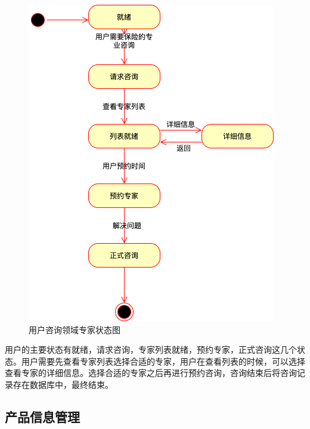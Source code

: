 \documentclass[a4paper]{ctexart}
\begin{document}
\begin{figure}[H]
\centering
\includegraphics[scale=0.5]{image/3_6状态图.png}
\caption{用户咨询领域专家状态图}
\label{fig:用户咨询领域专家状态图}
\end{figure}
用户的主要状态有就绪，请求咨询，专家列表就绪，预约专家，正式咨询这几个状态。用户需要先查看专家列表选择合适的专家，用户在查看列表的时候，可以选择查看专家的详细信息。选择合适的专家之后再进行预约咨询，咨询结束后将咨询记录存在数据库中，最终结束。\\

\subsection{产品信息管理}
\end{document}
